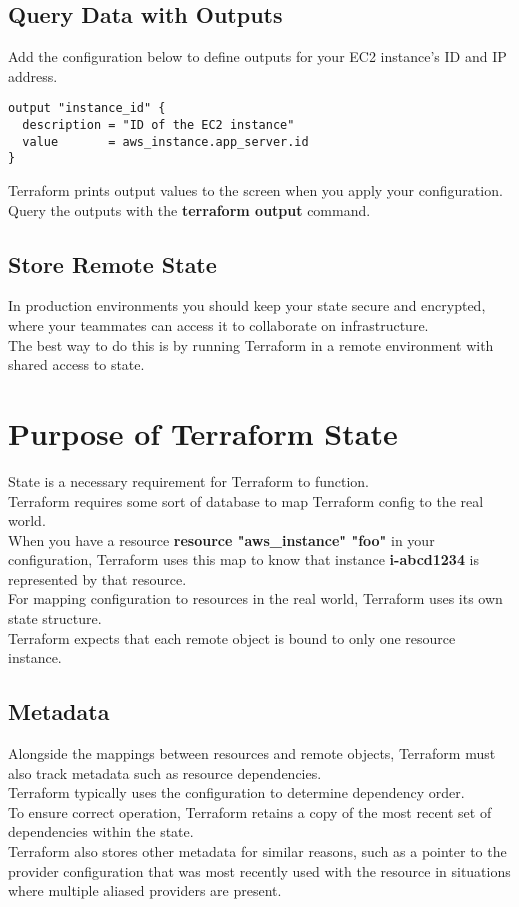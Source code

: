 \documentclass[12pt, letterpaper, twoside]{article}
\begin{document}
\subsection{Query Data with Outputs}

Add the configuration below to define outputs for your EC2 instance's ID and IP address.
\begin{verbatim}
output "instance_id" {
  description = "ID of the EC2 instance"
  value       = aws_instance.app_server.id
}
\end{verbatim}
Terraform prints output values to the screen when you apply your configuration.\\
Query the outputs with the \textbf{terraform output} command.

\subsection{Store Remote State}
In production environments you should keep your state secure and encrypted, where your 
teammates can access it to collaborate on infrastructure.\\
The best way to do this is by running Terraform in a remote environment with shared access to state.

\section{Purpose of Terraform State}
State is a necessary requirement for Terraform to function.\\


Terraform requires some sort of database to map Terraform config to the real world.\\
When you have a resource \textbf{resource "aws\_instance" "foo"} in your configuration, 
Terraform uses this map to know that instance \textbf{i-abcd1234} is represented by that resource.\\
For mapping configuration to resources in the real world, Terraform uses its own state structure.\\
Terraform expects that each remote object is bound to only one resource instance.\\

\subsection{Metadata}
Alongside the mappings between resources and remote objects, Terraform must also track metadata 
such as resource dependencies.\\
Terraform typically uses the configuration to determine dependency order.\\
To ensure correct operation, Terraform retains a copy of the most recent set of dependencies within the state.\\
Terraform also stores other metadata for similar reasons, such as a pointer to the provider 
configuration that was most recently used with the resource in situations where multiple 
aliased providers are present.\\
\end{document}
